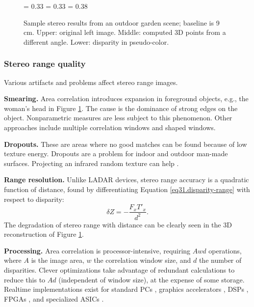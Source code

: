 \documentclass[twocolumn,oneside]{book}
\begin{document}
\begin{figure}

{\epsfxsize = 0.33\textwidth {}}
{\epsfxsize = 0.33\textwidth {}}
{\epsfxsize = 0.38\textwidth {}}

\caption{
Sample stereo results from an outdoor garden scene; baseline is 9 cm.
Upper: original left image.  Middle: computed 3D points from a
different angle.  Lower: disparity in pseudo-color.
\label{fig23.garden-results}}

\end{figure}


\subsubsection{Stereo range quality}

Various artifacts and problems affect stereo range images.

{\bf Smearing.}  Area correlation introduces expansion in foreground
objects, e.g., the woman's head in Figure \ref{fig23.garden-results}.
The cause is the dominance of strong edges on the object.
Nonparametric measures are less subject to this phenomenon.  Other
approaches include multiple correlation windows and shaped windows.

{\bf Dropouts.}  These are areas where no good matches can be found
because of low texture energy.  Dropouts are a problem for indoor and
outdoor man-made surfaces.  Projecting an infrared random texture can
help \cite{adan}.

{\bf Range resolution.}  Unlike LADAR devices, stereo range accuracy
is a quadratic function of distance, found by differentiating Equation
\ref{eq31.disparity-range} with respect to disparity:
\begin{equation}
 \delta Z = -\frac{F_x T'_x}{d^2}.
\end{equation}
The degradation of stereo range with distance can be clearly seen in
the 3D reconstruction of Figure \ref{fig23.garden-results}.

{\bf Processing.}  Area correlation is processor-intensive, requiring
$Awd$ operations, where $A$ is the image area, $w$ the correlation
window size, and $d$ the number of disparities.  Clever optimizations
take advantage of redundant calculations to reduce this to $Ad$
(independent of window size), at the expense of some storage.
Realtime implementations exist for standard PCs \cite{videre,ptgrey},
graphics accelerators \cite{zach03accurate,yang03multiresolution},
DSPs \cite{konolige97}, FPGAs \cite{videre,focusrobotics}, and
specialized ASICs \cite{tyzx}.
\end{document}
